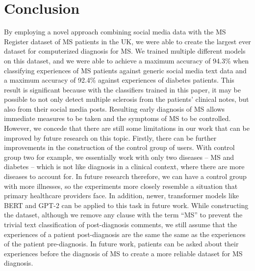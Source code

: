 \documentclass[11pt,a4paper]{article}
\begin{document}
\section{Conclusion}
By employing a novel approach combining social media data with the MS Register dataset of MS patients in the UK, we were able to create the largest ever dataset for computerized diagnosis for MS. We trained multiple different models on this dataset, and we were able to achieve a maximum accuracy of 94.3\% when classifying experiences of MS patients against generic social media text data and a maximum accuracy of 92.4\% against experiences of diabetes patients. This result is significant because with the classifiers trained in this paper, it may be possible to not only detect multiple sclerosis from the patients’ clinical notes, but also from their social media posts. Resulting early diagnosis of MS allows immediate measures to be taken and the symptoms of MS to be controlled. \\
\indent However, we concede that there are still some limitations in our work that can be improved by future research on this topic.  Firstly, there can be further improvements in the construction of the control group of users. With control group two for example, we essentially work with only two diseases – MS and diabetes – which is not like diagnosis in a clinical context, where there are more diseases to account for. In future research therefore, we can have a control group with more illnesses, so the experiments more closely resemble a situation that primary healthcare providers face. In addition, newer, transformer models like BERT and GPT-2 can be applied to this task in future work. While constructing the dataset, although we remove any clause with the term “MS” to prevent the trivial text classification of post-diagnosis comments, we still assume that the experiences of a patient post-diagnosis are the same the same as the experiences of the patient pre-diagnosis. In future work, patients can be asked about their experiences before the diagnosis of MS to create a more reliable dataset for MS diagnosis.


\appendix
\end{document}
